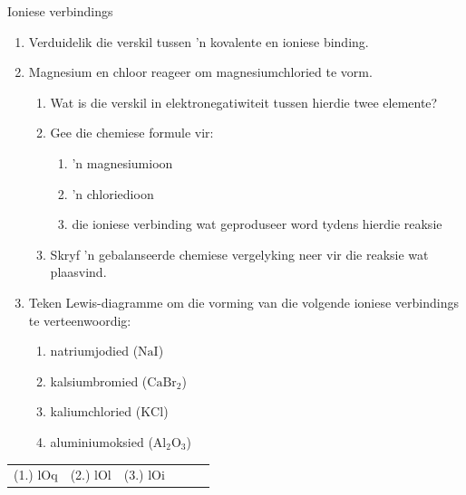 \begin{exercises}{Ioniese verbindings}
{
            \nopagebreak
        \label{m38684*id142562}\begin{enumerate}[noitemsep, label=\textbf{\arabic*}. ] 
            \label{m38684*uid57}\item Verduidelik die verskil tussen  'n kovalente en ioniese binding.\newline
\label{m38684*uid58}\item Magnesium en chloor reageer om magnesiumchloried te vorm.
\label{m38684*id142602}\begin{enumerate}[noitemsep, label=\textbf{\alph*}. ] 
            \label{m38684*uid59}\item Wat is die verskil in elektronegatiwiteit tussen hierdie twee elemente?
\label{m38684*uid60}\item Gee die chemiese formule vir:
\label{m38684*id142630}\begin{enumerate}[noitemsep, label=\textbf{\roman*}. ] 
            \label{m38684*uid61}\item  'n magnesiumioon
\label{m38684*uid62}\item  'n chloriedioon
\label{m38684*uid63}\item die ioniese verbinding wat geproduseer word tydens hierdie reaksie
\end{enumerate}
        \label{m38684*uid64}\item Skryf  'n gebalanseerde chemiese vergelyking neer vir die reaksie wat plaasvind.
\end{enumerate}
        \label{m38684*uid65}\item Teken Lewis-diagramme om die vorming van die volgende ioniese verbindings te verteenwoordig:
\label{m38684*id142697}\begin{enumerate}[noitemsep, label=\textbf{\alph*}. ] 
            \label{m38684*uid66}\item natriumjodied  ($\text{NaI}$)
\label{m38684*uid67}\item kalsiumbromied ($\text{CaBr}{}_{2}$)
\label{m38684*uid68}\item kaliumchloried ($\text{KCl}$)
\item aluminiumoksied ($\text{Al}_{2}\text{O}_{3}$)
\end{enumerate}
        \end{enumerate}

\practiceinfo
\begin{tabular}[h]{cccccc}
 (1.) lOq  &  (2.) lOl  &  (3.) lOi  &
\end{tabular}
}
\end{exercises}

